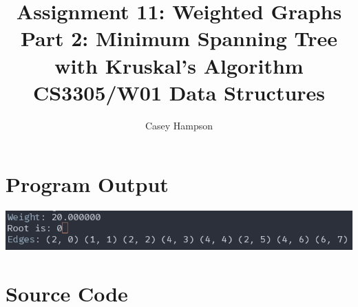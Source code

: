 \documentclass{article}
\title{Assignment 11: Weighted Graphs \\[5pt] Part 2: Minimum Spanning Tree with Kruskal's Algorithm \\[8pt] CS3305/W01 Data Structures}
\author{Casey Hampson}
\begin{document}
\maketitle


\section*{Program Output}
\begin{center}
  \includegraphics[width=0.8\linewidth]{./res/1.png}
\end{center}


\pagebreak
\section*{Source Code}
\inputminted{java}{./P2.java} 
\end{document}
